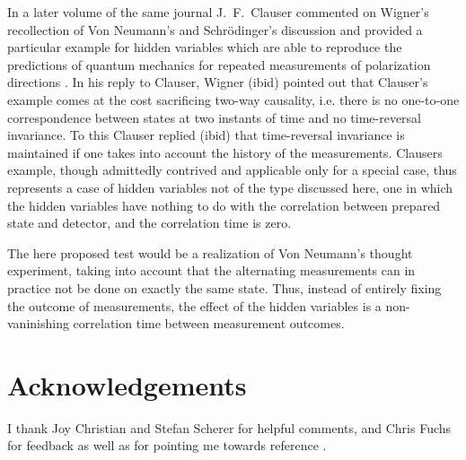 \documentclass[12pt]{article}                    %
\begin{document}
In a later volume of the same journal J.~F.~Clauser commented on
Wigner's recollection of Von Neumann's and Schr\"odinger's discussion
and provided a particular example for hidden variables which 
are able to reproduce the predictions of
quantum mechanics for repeated measurements of polarization directions \cite{Clauser}. In
his reply to Clauser, Wigner (ibid) pointed out that Clauser's example
comes at the cost sacrificing two-way causality, i.e. there is no one-to-one
correspondence between states at two instants of time and no
time-reversal invariance. To this Clauser replied (ibid) that time-reversal
invariance is maintained if one takes into account the history of
the measurements. Clausers example, though admittedly contrived and
applicable only for a special case, thus represents
a case of hidden variables not of the type discussed here, one in which
the hidden variables have nothing to do with the correlation between
prepared state and detector, and the correlation time is zero.

The here proposed test would be a realization of Von Neumann's
thought experiment, taking into account that the alternating
measurements can in practice not be done on exactly the same
state. Thus, instead of entirely fixing the outcome of measurements,
the effect of the hidden variables is a non-vaninishing 
correlation time between measurement outcomes.


\section*{Acknowledgements}

I thank Joy Christian and Stefan Scherer for helpful comments, and Chris Fuchs for feedback as well as
for pointing me towards reference \cite{Wigner:1976ga}. 
\end{document}
